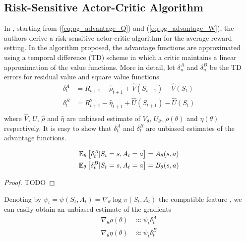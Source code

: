 \subsection{Risk-Sensitive Actor-Critic Algorithm}
In \cite{prashanth2014actor}, starting from (\ref{eq:pg_advantage_Q}) and 
(\ref{eq:pg_advantage_W}), the authors derive a risk-sensitive actor-critic 
algorithm for the average reward setting. In the algorithm proposed, the
advantage functions are approximated using a temporal difference (TD) scheme in
which a critic maintains a linear approximation of the value functions. More in
detail, let $\delta_n^A$ and $\delta_n^B$ be the TD errors for residual value
and square value functions
\begin{equation}
	\begin{split}
		\delta_t^A &= R_{t+1} - \widehat{\rho}_{t+1} + \widehat{V}(S_{t+1}) -
		\widehat{V}(S_t)\\
		\delta_t^B &= R_{t+1}^2 - \widehat{\eta}_{t+1} + \widehat{U}(S_{t+1}) -
		\widehat{U}(S_t)\\
	\end{split}
\end{equation}
where $\widehat{V}$, $\widehat{U}$, $\widehat{\rho}$ and $\widehat{\eta}$ are
unbiased estimate of $V_\theta$, $U_\theta$, $\rho(\theta)$ and $\eta(\theta)$
respectively. It is easy to show that $\delta_t^A$ and $\delta_t^B$ are
unbiased estimates of the advantage functions.
\begin{proposition}
	\begin{equation}
		\begin{split}
			\E[\theta]{\delta_t^A|S_t = s, A_t = a} &= A_\theta(s, a)\\
			\E[\theta]{\delta_t^B|S_t = s, A_t = a} &= B_\theta(s, a)\\
		\end{split}
	\end{equation}
\end{proposition}
\begin{proof}
	TODO
\end{proof}
Denoting by $\psi_t = \psi(S_t, A_t) = \nabla_\theta \log \pi(S_t, A_t)$ the
compatible feature \cite{sutton1999policy}, we can easily obtain an unbiased
estimate of the gradients 
\begin{equation}
	\begin{split}
		\nabla_\theta \rho(\theta) &\approx \psi_t \delta_t^A\\
		\nabla_\theta \eta(\theta) &\approx \psi_t \delta_t^B\\
	\end{split}
\end{equation}
